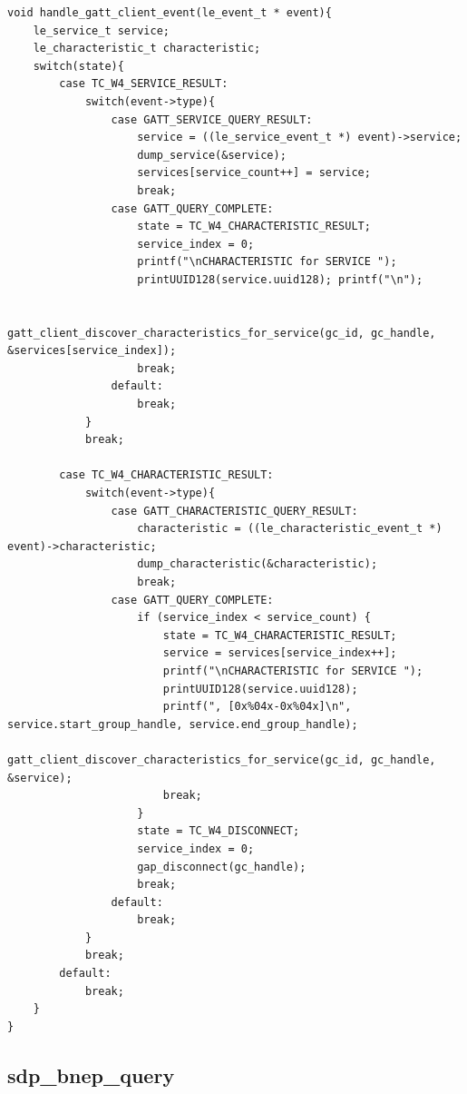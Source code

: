 \documentclass[a4paper,titlepage,oneside,12pt]{amsart} %
\begin{document}
\begin{lstlisting}[caption=GATT client queries handling., label=code:gattBrowserQueryHandler]
void handle_gatt_client_event(le_event_t * event){
    le_service_t service;
    le_characteristic_t characteristic;
    switch(state){
        case TC_W4_SERVICE_RESULT:
            switch(event->type){
                case GATT_SERVICE_QUERY_RESULT:
                    service = ((le_service_event_t *) event)->service;
                    dump_service(&service);
                    services[service_count++] = service;
                    break;
                case GATT_QUERY_COMPLETE:
                    state = TC_W4_CHARACTERISTIC_RESULT;
                    service_index = 0;
                    printf("\nCHARACTERISTIC for SERVICE ");
                    printUUID128(service.uuid128); printf("\n");
                    
                    gatt_client_discover_characteristics_for_service(gc_id, gc_handle, &services[service_index]);
                    break;
                default:
                    break;
            }
            break;
            
        case TC_W4_CHARACTERISTIC_RESULT:
            switch(event->type){
                case GATT_CHARACTERISTIC_QUERY_RESULT:
                    characteristic = ((le_characteristic_event_t *) event)->characteristic;
                    dump_characteristic(&characteristic);
                    break;
                case GATT_QUERY_COMPLETE:
                    if (service_index < service_count) {
                        state = TC_W4_CHARACTERISTIC_RESULT;
                        service = services[service_index++];
                        printf("\nCHARACTERISTIC for SERVICE ");
                        printUUID128(service.uuid128);
                        printf(", [0x%04x-0x%04x]\n", service.start_group_handle, service.end_group_handle);
                        gatt_client_discover_characteristics_for_service(gc_id, gc_handle, &service);
                        break;
                    }
                    state = TC_W4_DISCONNECT;
                    service_index = 0;
                    gap_disconnect(gc_handle);
                    break;
                default:
                    break;
            }
            break;
        default:
            break;
    }
}
\end{lstlisting}




\subsection{sdp\_bnep\_query}
\end{document}
